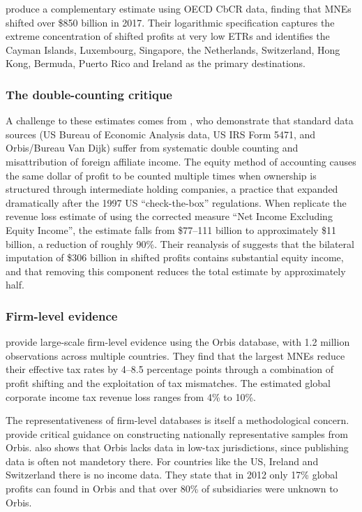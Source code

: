\documentclass[11pt,a4paper]{article}
\begin{document}
\citet{garcia-bernardo2024} produce a complementary estimate using OECD CbCR data, finding that MNEs shifted over \$850 billion in 2017. Their logarithmic specification captures the extreme concentration of shifted profits at very low ETRs and identifies the Cayman Islands, Luxembourg, Singapore, the Netherlands, Switzerland, Hong Kong, Bermuda, Puerto Rico and Ireland as the primary destinations.

\subsubsection{The double-counting critique}

A challenge to these estimates comes from \citet{blouin2023}, who demonstrate that standard data sources (US Bureau of Economic Analysis data, US IRS Form 5471, and Orbis/Bureau Van Dijk) suffer from systematic double counting and misattribution of foreign affiliate income. The equity method of accounting causes the same dollar of profit to be counted multiple times when ownership is structured through intermediate holding companies, a practice that expanded dramatically after the 1997 US ``check-the-box'' regulations. When \citet{blouin2023} replicate the revenue loss estimate of \citet{clausing2016} using the corrected measure ``Net Income Excluding Equity Income'', the estimate falls from \$77--111 billion to approximately \$11 billion, a reduction of roughly 90\%. Their reanalysis of \citet{torslov2023} suggests that the bilateral imputation of \$306 billion in shifted profits contains substantial equity income, and that removing this component reduces the total estimate by approximately half.


\subsubsection{Firm-level evidence}

\citet{johansson2017} provide large-scale firm-level evidence using the Orbis database, with 1.2 million observations across multiple countries. They find that the largest MNEs reduce their effective tax rates by 4--8.5 percentage points through a combination of profit shifting and the exploitation of tax mismatches. The estimated global corporate income tax revenue loss ranges from 4\% to 10\%. 

The representativeness of firm-level databases is itself a methodological concern. \citet{kalemli-ozcan2015} provide critical guidance on constructing nationally representative samples from Orbis. \citet{torslov2023} also shows that Orbis lacks data in low-tax jurisdictions, since publishing data is often not mandetory there. For countries like the US, Ireland and Switzerland there is no income data. They state that in 2012 only 17\% global profits can found in Orbis and that over 80\% of subsidiaries were unknown to Orbis. 
\end{document}
